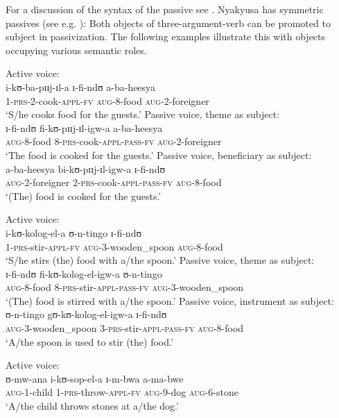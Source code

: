 For a discussion of the syntax of the passive see \citet{LusekeloA2012}. Nyakyusa has symmetric passives (see e.g. \citealt{BresnanJMoshiL1990}): Both objects of three-argument-verb can be promoted to subject in passivization. The following examples illustrate this with objects occupying various semantic roles.
\begin{exe}
\ex
\begin{xlist}
\ex Active voice:\\
\gll i-kʊ-ba-pɪɪj-ɪl-a ɪ-fi-ndʊ a-ba-heesya\\
1-\textsc{prs}-2-cook-\textsc{appl}-\textsc{fv} \textsc{aug}-8-food \textsc{aug}-2-foreigner\\
\glt \lq S/he cooks food for the guests.'
\ex Passive voice, theme as subject:\\
\gll ɪ-fi-ndʊ fi-kʊ-pɪɪj-ɪl-igw-a a-ba-heesya\\
\textsc{aug}-8-food 8-\textsc{prs}-cook-\textsc{appl}-\textsc{pass}-\textsc{fv} \textsc{aug}-2-foreigner\\
\glt \lq The food is cooked for the guests.'
\ex Passive voice, beneficiary as subject:\\
\gll a-ba-heesya bi-kʊ-pɪɪj-ɪl-igw-a ɪ-fi-ndʊ\\
\textsc{aug}-2-foreigner 2-\textsc{prs}-cook-\textsc{appl}-\textsc{pass}-\textsc{fv} \textsc{aug}-8-food\\
\glt \lq (The) food is cooked for the guests.'\footnotemark
\end{xlist}
\ex
\begin{xlist}
\ex Active voice:\\
\gll i-kʊ-kolog-el-a ʊ-n-tingo ɪ-fi-ndʊ\\
1-\textsc{prs}-stir-\textsc{appl}-\textsc{fv} \textsc{aug}-3-wooden\_spoon \textsc{aug}-8-food\\
\glt \lq S/he stirs (the) food with a/the spoon.'
\ex Passive voice, theme as subject:\\
\gll ɪ-fi-ndʊ fi-kʊ-kolog-el-igw-a ʊ-n-tingo\\
\textsc{aug}-8-food 8-\textsc{prs}-stir-\textsc{appl}-\textsc{pass}-\textsc{fv} \textsc{aug}-3-wooden\_spoon\\
\glt \lq (The) food is stirred with a/the spoon.'
\ex Passive voice, instrument as subject:\\
\gll ʊ-n-tingo gʊ-kʊ-kolog-el-igw-a ɪ-fi-ndʊ\\
\textsc{aug}-3-wooden\_spoon 3-\textsc{prs}-stir-\textsc{appl}-\textsc{pass}-\textsc{fv} \textsc{aug}-8-food\\
\glt \lq A/the spoon is used to stir (the) food.'
\end{xlist}
\ex
\begin{xlist}
\ex Active voice:\\
\gll ʊ-mw-ana i-kʊ-sop-el-a ɪ-m-bwa a-ma-bwe\\
\textsc{aug}-1-child 1-\textsc{prs}-throw-\textsc{appl}-\textsc{fv} \textsc{aug}-9-dog \textsc{aug}-6-stone\\
\glt \lq A/the child throws stones at a/the dog.'


\end{xlist}
\end{exe}
